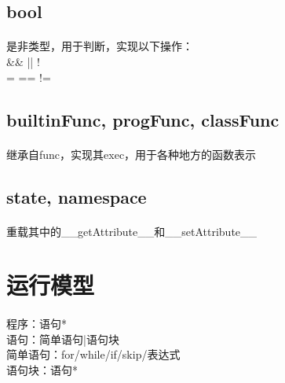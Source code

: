 \documentclass[UTF8, 12pt, a4paper]{article}
\begin{document}
		\subsection{bool}
			\paragraph{}
				是非类型，用于判断，实现以下操作：
				\\ \&\& || ! \^
				\\ = == !=
		\subsection{builtinFunc, progFunc, classFunc}
			\paragraph{}
				继承自func，实现其exec，用于各种地方的函数表示
		\subsection{state, namespace}
			\paragraph{}
				重载其中的\_\_getAttribute\_\_和\_\_setAttribute\_\_
		\section{运行模型}
			\paragraph{}
				程序：语句*
				\\语句：简单语句|语句块
				\\简单语句：for/while/if/skip/表达式
				\\语句块：{语句*}
\end{document}
